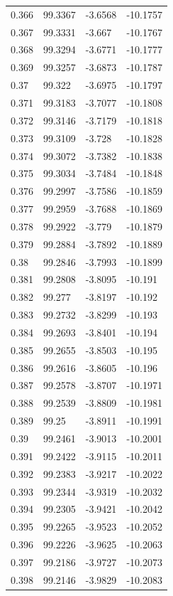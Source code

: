 \begin{tabular}{llll}
0.366 & 99.3367 & -3.6568 & -10.1757 \\
0.367 & 99.3331 & -3.667 & -10.1767 \\
0.368 & 99.3294 & -3.6771 & -10.1777 \\
0.369 & 99.3257 & -3.6873 & -10.1787 \\
0.37 & 99.322 & -3.6975 & -10.1797 \\
0.371 & 99.3183 & -3.7077 & -10.1808 \\
0.372 & 99.3146 & -3.7179 & -10.1818 \\
0.373 & 99.3109 & -3.728 & -10.1828 \\
0.374 & 99.3072 & -3.7382 & -10.1838 \\
0.375 & 99.3034 & -3.7484 & -10.1848 \\
0.376 & 99.2997 & -3.7586 & -10.1859 \\
0.377 & 99.2959 & -3.7688 & -10.1869 \\
0.378 & 99.2922 & -3.779 & -10.1879 \\
0.379 & 99.2884 & -3.7892 & -10.1889 \\
0.38 & 99.2846 & -3.7993 & -10.1899 \\
0.381 & 99.2808 & -3.8095 & -10.191 \\
0.382 & 99.277 & -3.8197 & -10.192 \\
0.383 & 99.2732 & -3.8299 & -10.193 \\
0.384 & 99.2693 & -3.8401 & -10.194 \\
0.385 & 99.2655 & -3.8503 & -10.195 \\
0.386 & 99.2616 & -3.8605 & -10.196 \\
0.387 & 99.2578 & -3.8707 & -10.1971 \\
0.388 & 99.2539 & -3.8809 & -10.1981 \\
0.389 & 99.25 & -3.8911 & -10.1991 \\
0.39 & 99.2461 & -3.9013 & -10.2001 \\
0.391 & 99.2422 & -3.9115 & -10.2011 \\
0.392 & 99.2383 & -3.9217 & -10.2022 \\
0.393 & 99.2344 & -3.9319 & -10.2032 \\
0.394 & 99.2305 & -3.9421 & -10.2042 \\
0.395 & 99.2265 & -3.9523 & -10.2052 \\
0.396 & 99.2226 & -3.9625 & -10.2063 \\
0.397 & 99.2186 & -3.9727 & -10.2073 \\
0.398 & 99.2146 & -3.9829 & -10.2083 \\

\end{tabular}
